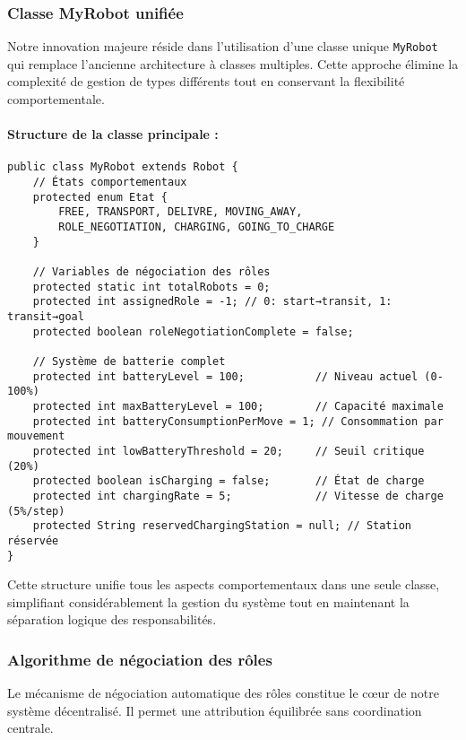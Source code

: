 \documentclass[12pt,a4paper]{article}
\newcommand{\code}[1]{\texttt{#1}}
\begin{document}
\subsubsection{Classe MyRobot unifiée}

Notre innovation majeure réside dans l'utilisation d'une classe unique \code{MyRobot} qui remplace l'ancienne architecture à classes multiples. Cette approche élimine la complexité de gestion de types différents tout en conservant la flexibilité comportementale.

\paragraph{Structure de la classe principale :}

\begin{lstlisting}[caption=Variables d'état et de batterie dans MyRobot]
public class MyRobot extends Robot {
    // États comportementaux
    protected enum Etat {
        FREE, TRANSPORT, DELIVRE, MOVING_AWAY,
        ROLE_NEGOTIATION, CHARGING, GOING_TO_CHARGE
    }

    // Variables de négociation des rôles
    protected static int totalRobots = 0;
    protected int assignedRole = -1; // 0: start→transit, 1: transit→goal
    protected boolean roleNegotiationComplete = false;

    // Système de batterie complet
    protected int batteryLevel = 100;           // Niveau actuel (0-100%)
    protected int maxBatteryLevel = 100;        // Capacité maximale
    protected int batteryConsumptionPerMove = 1; // Consommation par mouvement
    protected int lowBatteryThreshold = 20;     // Seuil critique (20%)
    protected boolean isCharging = false;       // État de charge
    protected int chargingRate = 5;             // Vitesse de charge (5%/step)
    protected String reservedChargingStation = null; // Station réservée
}
\end{lstlisting}

Cette structure unifie tous les aspects comportementaux dans une seule classe, simplifiant considérablement la gestion du système tout en maintenant la séparation logique des responsabilités.

\subsubsection{Algorithme de négociation des rôles}

Le mécanisme de négociation automatique des rôles constitue le cœur de notre système décentralisé. Il permet une attribution équilibrée sans coordination centrale.
\end{document}
